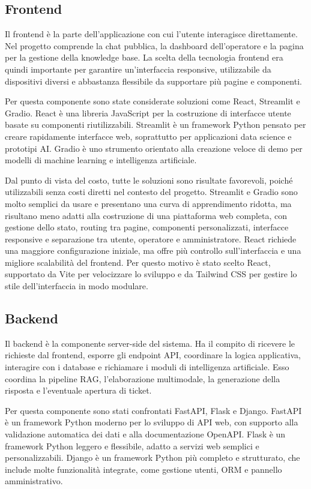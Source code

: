 \subsection*{Frontend}

Il frontend è la parte dell’applicazione con cui l’utente interagisce direttamente. Nel progetto comprende la chat pubblica, la dashboard dell’operatore e la pagina per la gestione della knowledge base. La scelta della tecnologia frontend era quindi importante per garantire un’interfaccia responsive, utilizzabile da dispositivi diversi e abbastanza flessibile da supportare più pagine e componenti.

Per questa componente sono state considerate soluzioni come React, Streamlit e Gradio. React è una libreria JavaScript per la costruzione di interfacce utente basate su componenti riutilizzabili. Streamlit è un framework Python pensato per creare rapidamente interfacce web, soprattutto per applicazioni data science e prototipi AI. Gradio è uno strumento orientato alla creazione veloce di demo per modelli di machine learning e intelligenza artificiale.

Dal punto di vista del costo, tutte le soluzioni sono risultate favorevoli, poiché utilizzabili senza costi diretti nel contesto del progetto. Streamlit e Gradio sono molto semplici da usare e presentano una curva di apprendimento ridotta, ma risultano meno adatti alla costruzione di una piattaforma web completa, con gestione dello stato, routing tra pagine, componenti personalizzati, interfacce responsive e separazione tra utente, operatore e amministratore. React richiede una maggiore configurazione iniziale, ma offre più controllo sull’interfaccia e una migliore scalabilità del frontend. Per questo motivo è stato scelto React, supportato da Vite per velocizzare lo sviluppo e da Tailwind CSS per gestire lo stile dell’interfaccia in modo modulare.

\subsection*{Backend}

Il backend è la componente server-side del sistema. Ha il compito di ricevere le richieste dal frontend, esporre gli endpoint API, coordinare la logica applicativa, interagire con i database e richiamare i moduli di intelligenza artificiale. Esso coordina la pipeline RAG, l’elaborazione multimodale, la generazione della risposta e l’eventuale apertura di ticket.

Per questa componente sono stati confrontati FastAPI, Flask e Django. FastAPI è un framework Python moderno per lo sviluppo di API web, con supporto alla validazione automatica dei dati e alla documentazione OpenAPI. Flask è un framework Python leggero e flessibile, adatto a servizi web semplici e personalizzabili. Django è un framework Python più completo e strutturato, che include molte funzionalità integrate, come gestione utenti, ORM e pannello amministrativo.

